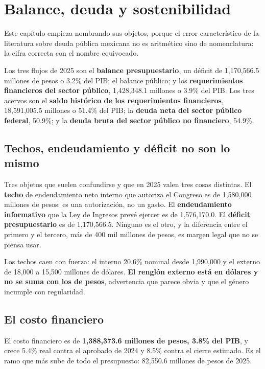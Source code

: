 \chapter{Balance, deuda y sostenibilidad}

Este capítulo empieza nombrando sus objetos, porque el error característico de la
literatura sobre deuda pública mexicana no es aritmético sino de nomenclatura: la
cifra correcta con el nombre equivocado.

Los tres flujos de 2025 son el \textbf{balance presupuestario}, un déficit de
1,170,566.5 millones de pesos o 3.2\% del PIB; el balance público; y los
\textbf{requerimientos financieros del sector público}, 1,428,348.1 millones o
3.9\% del PIB. Los tres acervos son el \textbf{saldo histórico de los
requerimientos financieros}, 18,591,005.5 millones o 51.4\% del PIB; la
\textbf{deuda neta del sector público federal}, 50.9\%; y la \textbf{deuda bruta
del sector público no financiero}, 54.9\%.

\section{Techos, endeudamiento y déficit no son lo mismo}



Tres objetos que suelen confundirse y que en 2025 valen tres cosas distintas. El
\textbf{techo} de endeudamiento neto interno que autoriza el Congreso es de
1,580,000 millones de pesos: es una autorización, no un gasto. El
\textbf{endeudamiento informativo} que la Ley de Ingresos prevé ejercer es de
1,576,170.0. El \textbf{déficit presupuestario} es de 1,170,566.5. Ninguno es el
otro, y la diferencia entre el primero y el tercero, más de 400 mil millones de
pesos, es margen legal que no se piensa usar.

Los techos caen con fuerza: el interno 20.6\% nominal desde 1,990,000 y el externo
de 18,000 a 15,500 millones de dólares. \textbf{El renglón externo está en dólares
y no se suma con los de pesos}, advertencia que parece obvia y que el género
incumple con regularidad.

\section{El costo financiero}

El costo financiero es de \textbf{1,388,373.6 millones de pesos, 3.8\% del PIB}, y
crece 5.4\% real contra el aprobado de 2024 y 8.5\% contra el cierre estimado. Es
el ramo que más sube de todo el presupuesto: 82,550.6 millones de pesos de 2025.

